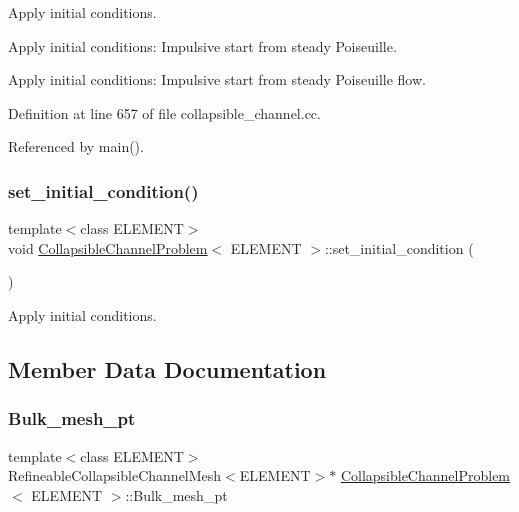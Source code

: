 Apply initial conditions. 

Apply initial conditions\+: Impulsive start from steady Poiseuille.

Apply initial conditions\+: Impulsive start from steady Poiseuille flow. 

Definition at line 657 of file collapsible\+\_\+channel.\+cc.



Referenced by main().

\mbox{\label{classCollapsibleChannelProblem_a646147fb75669cfcc5bb56ee79d9b8da}} 
\subsubsection{\texorpdfstring{set\+\_\+initial\+\_\+condition()}{set\_initial\_condition()}\hspace{0.1cm}{\footnotesize\ttfamily [2/2]}}
{\footnotesize\ttfamily template$<$class E\+L\+E\+M\+E\+NT$>$ \\
void \hyperlink{classCollapsibleChannelProblem}{Collapsible\+Channel\+Problem}$<$ E\+L\+E\+M\+E\+NT $>$\+::set\+\_\+initial\+\_\+condition (\begin{DoxyParamCaption}{ }\end{DoxyParamCaption})}



Apply initial conditions. 



\subsection{Member Data Documentation}
\mbox{\label{classCollapsibleChannelProblem_acd96e5a1d72cc3a1aad196c97dcb3883}} 
\subsubsection{\texorpdfstring{Bulk\+\_\+mesh\+\_\+pt}{Bulk\_mesh\_pt}\hspace{0.1cm}{\footnotesize\ttfamily [1/2]}}
{\footnotesize\ttfamily template$<$class E\+L\+E\+M\+E\+NT$>$ \\
Refineable\+Collapsible\+Channel\+Mesh$<$E\+L\+E\+M\+E\+NT$>$$\ast$ \hyperlink{classCollapsibleChannelProblem}{Collapsible\+Channel\+Problem}$<$ E\+L\+E\+M\+E\+NT $>$\+::Bulk\+\_\+mesh\+\_\+pt\hspace{0.3cm}{\ttfamily [private]}}



